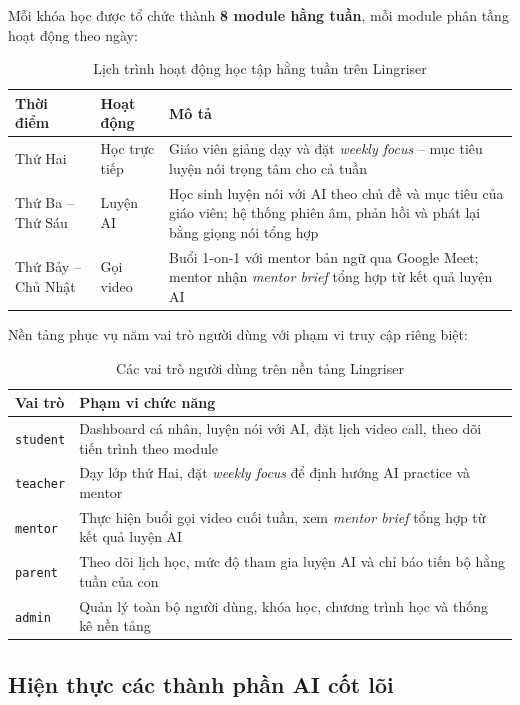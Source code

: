 Mỗi khóa học được tổ chức thành \textbf{8 module hằng tuần}, mỗi module phân tầng hoạt động theo ngày:

\begin{table}[H]
\centering
\begin{tabular}{|l|l|p{7.5cm}|}
\hline
\textbf{Thời điểm} & \textbf{Hoạt động} & \textbf{Mô tả} \\ \hline
Thứ Hai & Học trực tiếp & Giáo viên giảng dạy và đặt \textit{weekly focus} -- mục tiêu luyện nói trọng tâm cho cả tuần \\ \hline
Thứ Ba -- Thứ Sáu & Luyện AI & Học sinh luyện nói với AI theo chủ đề và mục tiêu của giáo viên; hệ thống phiên âm, phản hồi và phát lại bằng giọng nói tổng hợp \\ \hline
Thứ Bảy -- Chủ Nhật & Gọi video & Buổi 1-on-1 với mentor bản ngữ qua Google Meet; mentor nhận \textit{mentor brief} tổng hợp từ kết quả luyện AI \\ \hline
\end{tabular}
\caption{Lịch trình hoạt động học tập hằng tuần trên Lingriser}
\end{table}

Nền tảng phục vụ năm vai trò người dùng với phạm vi truy cập riêng biệt:

\begin{table}[H]
\centering
\begin{tabular}{|l|p{9.5cm}|}
\hline
\textbf{Vai trò} & \textbf{Phạm vi chức năng} \\ \hline
\texttt{student} & Dashboard cá nhân, luyện nói với AI, đặt lịch video call, theo dõi tiến trình theo module \\ \hline
\texttt{teacher} & Dạy lớp thứ Hai, đặt \textit{weekly focus} để định hướng AI practice và mentor \\ \hline
\texttt{mentor} & Thực hiện buổi gọi video cuối tuần, xem \textit{mentor brief} tổng hợp từ kết quả luyện AI \\ \hline
\texttt{parent} & Theo dõi lịch học, mức độ tham gia luyện AI và chỉ báo tiến bộ hằng tuần của con \\ \hline
\texttt{admin} & Quản lý toàn bộ người dùng, khóa học, chương trình học và thống kê nền tảng \\ \hline
\end{tabular}
\caption{Các vai trò người dùng trên nền tảng Lingriser}
\end{table}

\subsection{Hiện thực các thành phần AI cốt lõi}

